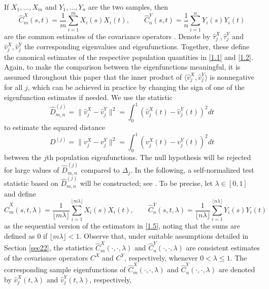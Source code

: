 \documentclass[11pt]{article}
\numberwithin{equation}{section}
\numberwithin{theorem}{section}
\numberwithin{lemma}{section}
\numberwithin{proposition}{section}
\numberwithin{cor}{section}
\numberwithin{definition}{section}
\numberwithin{cons}{section}
\numberwithin{rem}{section}
\numberwithin{exa}{section}
\numberwithin{table}{section}
\numberwithin{figure}{section}
\numberwithin{algo}{section}
\begin{document}
{{If $X_1,\ldots, X_m$ and $Y_1,\ldots, Y_n$ are the two samples, then
\begin{equation}\label{1.5}
\hat C_m^X (s,t) = \frac {1}{m} \sum^m_{i=1} X_i(s) X_i(t),
\qquad
\hat C_n^Y (s,t) = \frac {1}{n} \sum^n_{i=1} Y_i(s) Y_i(t)
\end{equation}
are the common estimates of the covariance operators \citep{ramsay:silverman:2005,horvkoko2012}. Denote by $\hat \tau^X_j, \hat \tau^Y_j$ and $\hat v^X_j, \hat v^Y_j$ the corresponding eigenvalues and eigenfunctions.
Together, these define the canonical estimates of the respective population quantities in \eqref{1.1} and  \eqref{1.2}. Again, to make the comparison between the eigenfunctions meaningful, it is assumed throughout this paper that the inner product of $\langle \hat v^X_j , \hat v^Y_j\rangle$ is nonnegative for all $j$, which can be achieved in practice by changing the sign of one of the eigenfunction estimates if needed. We use the statistic
\begin{equation}\label{1.4}
 \hat D^{(j)}_{m,n} = \| \hat v^X_j - \hat v^Y_j \|^2 = \int^1_0 (\hat v^X_j(t) - \hat v^Y_j(t))^2 dt
\end{equation}
to estimate the squared distance
\begin{equation}
\label{dj}
D^{(j)} = \|  v^X_j  - v^Y_j  \|^{2} = \int^1_0 ( v^X_j(t) - v^Y_j(t))^2 dt
\end{equation}
 between the $j$th population eigenfunctions. The null hypothesis will be rejected for large values of $\hat D^{(j)}_{m,n}$ compared to $\Delta_j$.
In the following, a self-normalized test statistic based on  $\hat D^{(j)}_{m,n}$ will be constructed; see \cite{detkokvol2018}.
To be precise, let $\lambda \in [0,1]$ and define
\begin{equation}\label{1.5seq}
\hat C_m^X (s,t,\lambda ) = \frac {1}{\lfloor m \lambda \rfloor} \sum^{\lfloor m \lambda \rfloor}_{i=1} X_i(s) X_i(t), \qquad
\hat C_n^Y (s,t,\lambda ) = \frac {1}{\lfloor n \lambda \rfloor} \sum^{\lfloor n \lambda \rfloor}_{i=1} Y_i(s) Y_i(t)
\end{equation}
as the sequential version of the estimators  in \eqref{1.5}, noting that the sums are defined as $0$ if ${\lfloor m \lambda \rfloor} < 1$.
Observe that, under suitable assumptions detailed in Section \ref{sec22}, the statistics
 $\hat C_m^X (\cdot ,\cdot ,\lambda ) $ and $ \hat C_n^Y (\cdot ,\cdot ,\lambda)$
are consistent estimates of the covariance operators  $C^{X}$ and $C^Y$, respectively,
whenever $ 0 < \lambda \leq 1$.
The corresponding sample eigenfunctions of $\hat C^X_m (\cdot, \cdot, \lambda)$ and $\hat C^Y_n (\cdot, \cdot, \lambda)$  are denoted by $\hat v^X_j(t, \lambda)$ and $\hat v^Y_j(t,\lambda)$, respectively,
}}
\end{document}

